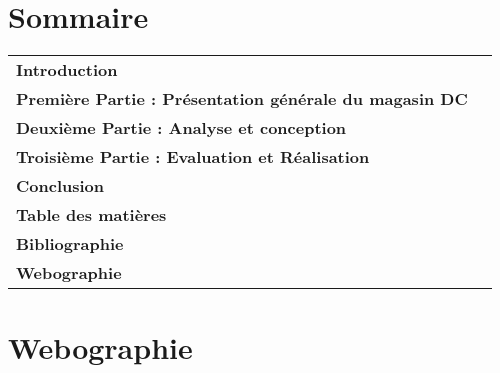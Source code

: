 \documentclass{report}
\begin{document}







\listoffigures
{}
\listoftables
{}

\chapter*{Sommaire}
\noindent\begin{tabularx}{\textwidth}{Xr}
  \textbf{Introduction} \dotfill \pageref{chap:introduction} \\

  \textbf{Première Partie : Présentation générale du magasin DC} \dotfill \pageref{part:presentation} \\

  \textbf{Deuxième Partie : Analyse et conception} \dotfill \pageref{part:analyse-et-conception} \\

  \textbf{Troisième Partie : Evaluation et Réalisation} \dotfill \pageref{part:evaluation-et-realisation} \\

  \textbf{Conclusion} \dotfill \pageref{chap:conclusion} \\

  \textbf{Table des matières} \dotfill \pageref{sec:tableofcontents} \\

  \textbf{Bibliographie} \dotfill \pageref{sec:bibliographie} \\

  \textbf{Webographie} \dotfill \pageref{sec:webographie} \\
\end{tabularx}






\newpage










\tableofcontents
\label{sec:tableofcontents}

\printbibliography
\label{sec:bibliographie}

\chapter*{Webographie}
\label{sec:webographie}
\end{document}
